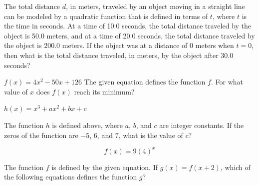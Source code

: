 \vspace{0.75em}


\newpage

\noindent\markforreview
\vspace{1em}

The total distance $d$, in meters, traveled by an object moving in a straight line can be modeled by a quadratic function that is defined in terms of $t$, where $t$ is the time in seconds. At a time of 10.0 seconds, the total distance traveled by the object is 50.0 meters, and at a time of 20.0 seconds, the total distance traveled by the object is 200.0 meters. If the object was at a distance of 0 meters when $t = 0$, then what is the total distance traveled, in meters, by the object after 30.0 seconds?

\vspace{2em}

\noindent\markforreview
\vspace{1em}

$f(x) = 4x^2 - 50x + 126$  
The given equation defines the function $f$.  
For what value of $x$ does $f(x)$ reach its minimum?

\vspace{2em}

\noindent\markforreview
\vspace{1em}

$h(x) = x^3 + ax^2 + bx + c$

The function $h$ is defined above, where $a$, $b$, and $c$ are integer constants.  
If the zeros of the function are $-5$, $6$, and $7$, what is the value of $c$?

\vspace{2em}

\noindent\markforreview
\vspace{1em}
\[f(x) = 9(4)^x\]


The function $f$ is defined by the given equation.  
If $g(x) = f(x + 2)$, which of the following equations defines the function $g$?

\vspace{0.75em}


\vspace{2em}


\newpage
\noindent\markforreview
\vspace{1em}

